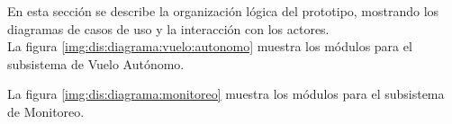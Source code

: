 %

En esta sección se describe la organización lógica del prototipo, mostrando los 
diagramas de casos de uso y la interacción con los actores. \\
La figura \ref{img:dis:diagrama:vuelo:autonomo} muestra los módulos para el 
subsistema de Vuelo Autónomo.


La figura \ref{img:dis:diagrama:monitoreo} muestra los módulos para el 
subsistema de Monitoreo.

